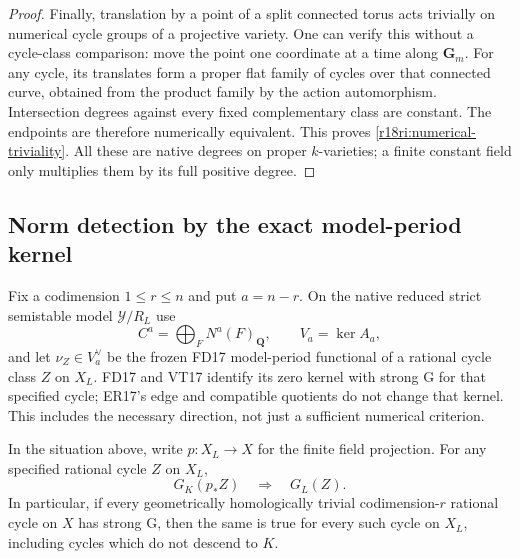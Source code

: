 \begin{proof}
Finally, translation by a point of a split connected torus acts
trivially on numerical cycle groups of a projective variety.
One can verify this without a cycle-class comparison: move the
point one coordinate at a time along $\mathbf G_m$.  For any
cycle, its translates form a proper flat family of cycles over
that connected curve, obtained from the product family by the
action automorphism.  Intersection degrees against every fixed
complementary class are constant.  The endpoints are therefore
numerically equivalent.  This proves
\eqref{r18ri:numerical-triviality}.  All these are native degrees on
proper $k$-varieties; a finite constant field only multiplies them
by its full positive degree.
\end{proof}

\subsection{Norm detection by the exact model-period kernel}

Fix a codimension $1\le r\le n$ and put $a=n-r$.
On the native reduced strict semistable model $\mathcal Y/R_L$ use
\[
 C^a=\bigoplus_FN^a(F)_{\mathbf Q},\qquad V_a=\ker A_a,
\]
and let $\nu_Z\in V_a^\vee$ be the frozen FD17 model-period
functional of a rational cycle class $Z$ on $X_L$.
FD17 and VT17 identify its zero kernel with strong G for that
specified cycle; ER17's edge and compatible quotients do not change
that kernel.  This includes the necessary direction, not just a
sufficient numerical criterion.

\begin{theorem}
\label{r18ri:norm}
In the situation above, write $p:X_L\to X$ for the finite field
projection.  For any specified rational cycle $Z$ on $X_L$,
\[
                       G_K(p_*Z)\quad\Longrightarrow\quad G_L(Z).
 \tag{RI18.9}\label{r18ri:norm-detection}
\]
In particular, if every geometrically homologically trivial
codimension-$r$ rational cycle on $X$ has strong G, then the same
is true for every such cycle on $X_L$, including cycles which do
not descend to $K$.
\end{theorem}

